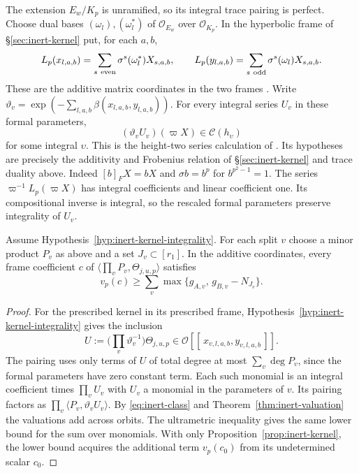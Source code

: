 The extension $E_w/K_p$ is unramified, so its integral trace pairing
is perfect. Choose dual bases $(\omega_l),(\omega_l^*)$ of
$\mathcal O_{E_w}$ over $\mathcal O_{K_p}$. In the hyperbolic frame
of \S\ref{sec:inert-kernel} put,
for each $a,b$,
\[
 L_p(x_{l,a,b})=\sum_{s\ {\rm even}}\sigma^s(\omega_l^*)X_{s,a,b},
 \qquad
 L_p(y_{l,a,b})=\sum_{s\ {\rm odd}}\sigma^s(\omega_l)X_{s,a,b}.
\]
These are the additive matrix coordinates in the two frames
\citep[Lemma~11.43]{adriazola-grh}.
Write $\vartheta_v=\exp(-\sum_{l,a,b}\beta(x_{l,a,b},y_{l,a,b}))$.
For every integral series $U_v$ in these formal parameters,
\begin{equation}\label{eq:inert-class}
         (\vartheta_v U_v)(\varpi X)\in\mathcal C(h_\upsilon)
\end{equation}
for some integral $\upsilon$. This is the height-two series calculation
of \citep[Proposition~9.5]{adriazola-grh}. Its hypotheses are precisely
the additivity and Frobenius relation of \S\ref{sec:inert-kernel}
and trace duality above. Indeed $[b]_F X=bX$ and $\sigma b=b^p$
for $b^{p^2-1}=1$. The series $\varpi^{-1}L_p(\varpi X)$ has integral
coefficients and linear coefficient one. Its compositional inverse is
integral, so the rescaled formal parameters preserve integrality of $U_v$.

\begin{corollary}\label{cor:inert-chain-jets}
Assume Hypothesis~\ref{hyp:inert-kernel-integrality}.
For each split $v$ choose a minor product $P_v$ as above and a set
$J_v\subset[r_1]$. In the additive coordinates, every frame coefficient
$c$ of $\langle\prod_v P_v,\Theta_{j,u,p}\rangle$ satisfies
\[
 v_p(c)\ge\sum_v\max\{g_{A,v},\,g_{B,v}-N_{J_v}\}.
\]
\end{corollary}

\begin{proof}
For the prescribed kernel in its prescribed frame, Hypothesis~\ref{hyp:inert-kernel-integrality}
gives the inclusion
\[
 U:=\Big(\prod_v\vartheta_v^{-1}\Big)\Theta_{j,u,p}
      \in\mathcal O[[\,x_{v,l,a,b},y_{v,l,a,b}\,]].
\]
The pairing uses only terms of $U$ of total degree at most
$\sum_v\deg P_v$, since the formal parameters have zero constant term.
Each such monomial is an integral coefficient times $\prod_v U_v$
with $U_v$ a monomial in the parameters of $v$. Its pairing factors as
$\prod_v\langle P_v,\vartheta_v U_v\rangle$. By
\eqref{eq:inert-class} and Theorem~\ref{thm:inert-valuation} the
valuations add across orbits. The ultrametric inequality gives the
same lower bound for the sum over monomials. With only Proposition~\ref{prop:inert-kernel},
the lower bound acquires the additional term $v_p(c_0)$ from its
undetermined scalar $c_0$.
\end{proof}

